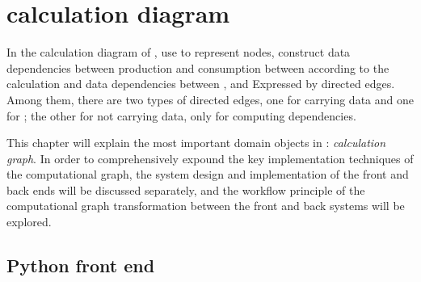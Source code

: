 \begin{savequote}[45mm]
\end{savequote}

\chapter{calculation diagram} 
\label{ch:computation-graph}

\begin{content}

In the calculation diagram of \tf{}, use  to represent nodes, construct data dependencies between production and consumption between  according to the calculation and data dependencies between , and Expressed by directed edges. Among them, there are two types of directed edges, one for carrying data and one for ; the other for not carrying data, only for computing dependencies.

This chapter will explain the most important domain objects in \tf{}: \emph{calculation graph}. In order to comprehensively expound the key implementation techniques of the computational graph, the system design and implementation of the front and back ends will be discussed separately, and the workflow principle of the computational graph transformation between the front and back systems will be explored.

\end{content}

\section{Python front end}

